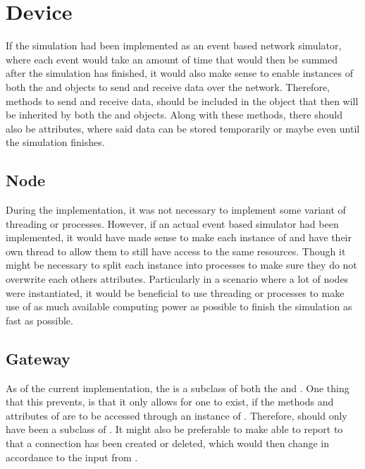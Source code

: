 \section{Device}
If the simulation had been implemented as an event based network simulator, where each event would take an amount of time that would then be summed after the simulation has finished, it would also make sense to enable instances of both the  and  objects to send and receive data over the network. Therefore, methods to send and receive data, should be included in the  object that then will be inherited by both the  and  objects. Along with these methods, there should also be attributes, where said data can be stored temporarily or maybe even until the simulation finishes.


\subsection{Node}
During the implementation, it was not necessary to implement some variant of threading or processes. However, if an actual event based simulator had been implemented, it would have made sense to make each instance of  and  have their own thread to allow them to still have access to the same resources. Though it might be necessary to split each instance into processes to make sure they do not overwrite each others attributes. Particularly in a scenario where a lot of nodes were instantiated, it would be beneficial to use threading or processes to make use of as much available computing power as possible to finish the simulation as fast as possible.


\subsection{Gateway}
As of the current implementation, the  is a subclass of both the  and . One thing that this prevents, is that it only allows for one  to exist, if the methods and attributes of  are to be accessed through an instance of . Therefore,  should only have been a subclass of . It might also be preferable to make  able to report to  that a connection has been created or deleted, which would then change  in accordance to the input from .


